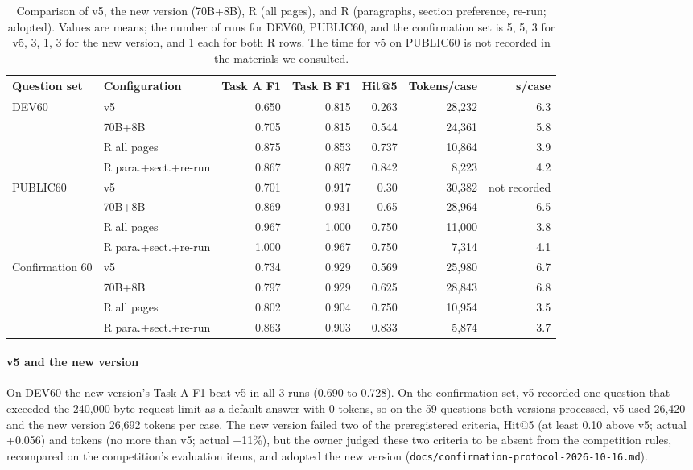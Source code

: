 \documentclass[10pt,a4paper]{article}
\begin{document}
\begin{table}[t]
  \centering
  \caption{Comparison of v5, the new version (70B+8B), R (all pages), and R (paragraphs, section preference, re-run; adopted). Values are means; the number of runs for DEV60, PUBLIC60, and the confirmation set is 5, 5, 3 for v5, 3, 1, 3 for the new version, and 1 each for both R rows. The time for v5 on PUBLIC60 is not recorded in the materials we consulted.}
  \label{tab:results}
  \small
  \begin{tabular}{llrrrrr}
    \toprule
    Question set & Configuration & Task A F1 & Task B F1 & Hit@5 & Tokens/case & s/case \\
    \midrule
    DEV60 & v5 & 0.650 & 0.815 & 0.263 & 28,232 & 6.3 \\
     & 70B+8B & 0.705 & 0.815 & 0.544 & 24,361 & 5.8 \\
     & R all pages & 0.875 & 0.853 & 0.737 & 10,864 & 3.9 \\
     & R para.+sect.+re-run & 0.867 & 0.897 & 0.842 & 8,223 & 4.2 \\
    \midrule
    PUBLIC60 & v5 & 0.701 & 0.917 & 0.30 & 30,382 & not recorded \\
     & 70B+8B & 0.869 & 0.931 & 0.65 & 28,964 & 6.5 \\
     & R all pages & 0.967 & 1.000 & 0.750 & 11,000 & 3.8 \\
     & R para.+sect.+re-run & 1.000 & 0.967 & 0.750 & 7,314 & 4.1 \\
    \midrule
    Confirmation 60 & v5 & 0.734 & 0.929 & 0.569 & 25,980 & 6.7 \\
     & 70B+8B & 0.797 & 0.929 & 0.625 & 28,843 & 6.8 \\
     & R all pages & 0.802 & 0.904 & 0.750 & 10,954 & 3.5 \\
     & R para.+sect.+re-run & 0.863 & 0.903 & 0.833 & 5,874 & 3.7 \\
    \bottomrule
  \end{tabular}
\end{table}

\paragraph{v5 and the new version}
On DEV60 the new version's Task A F1 beat v5 in all 3 runs (0.690 to 0.728). On the confirmation set, v5 recorded one question that exceeded the 240,000-byte request limit as a default answer with 0 tokens, so on the 59 questions both versions processed, v5 used 26,420 and the new version 26,692 tokens per case.
The new version failed two of the preregistered criteria, Hit@5 (at least 0.10 above v5; actual +0.056) and tokens (no more than v5; actual +11\%), but the owner judged these two criteria to be absent from the competition rules, recompared on the competition's evaluation items, and adopted the new version (\texttt{docs/confirmation-protocol-2026-10-16.md}).
\end{document}
